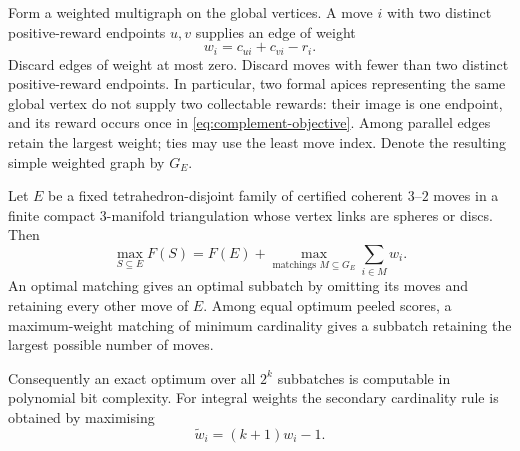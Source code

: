 Form a weighted multigraph on the global vertices. A move $i$ with
two distinct positive-reward endpoints $u,v$ supplies an edge of weight
\begin{equation}\label{eq:matching-weight}
 w_i=c_{ui}+c_{vi}-r_i.
\end{equation}
Discard edges of weight at most zero. Discard moves with fewer than
two distinct positive-reward endpoints. In particular, two formal
apices representing the same global vertex do not supply two
collectable rewards: their image is one endpoint, and its reward
occurs once in \eqref{eq:complement-objective}. Among parallel edges
retain the largest weight; ties may use the least move index. Denote
the resulting simple weighted graph by $G_E$.

\begin{theorem}
\label{thm:optimal-peeled-matching}
Let $E$ be a fixed tetrahedron-disjoint family of certified coherent
$3$--$2$ moves in a finite compact $3$-manifold triangulation whose
vertex links are spheres or discs. Then
\begin{equation}\label{eq:optimal-subset-matching}
 \max_{S\subseteq E}F(S)
   =F(E)+\max_{\text{matchings }M\subseteq G_E}\sum_{i\in M}w_i.
\end{equation}
An optimal matching gives an optimal subbatch by omitting its moves
and retaining every other move of $E$. Among equal optimum peeled
scores, a maximum-weight matching of minimum cardinality gives a
subbatch retaining the largest possible number of moves.

Consequently an exact optimum over all $2^k$ subbatches is computable
in polynomial bit complexity. For integral weights the secondary
cardinality rule is obtained by maximising
\begin{equation}\label{eq:matching-tie-weight}
 \widetilde w_i=(k+1)w_i-1.
\end{equation}
\end{theorem}

